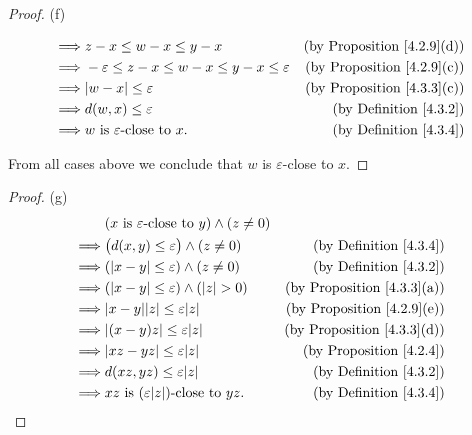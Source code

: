 \begin{proof}{(f)}
\begin{itemize}
\begin{align*}
                  \implies & z - x \leq w - x \leq y - x                                    & \text{(by Proposition \ref{4.2.9}(d))} \\
                  \implies & -\varepsilon \leq z - x \leq w - x \leq y - x \leq \varepsilon & \text{(by Proposition \ref{4.2.9}(c))} \\
                  \implies & \abs*{w - x} \leq \varepsilon                                  & \text{(by Proposition \ref{4.3.3}(c))} \\
                  \implies & d(w, x) \leq \varepsilon                                       & \text{(by Definition \ref{4.3.2})}     \\
                  \implies & w \text{ is } \varepsilon\text{-close to } x.                  & \text{(by Definition \ref{4.3.4})}
              \end{align*}
    \end{itemize}
    From all cases above we conclude that \(w\) is \(\varepsilon\)-close to \(x\).
\end{proof}

\begin{proof}{(g)}
    \begin{align*}
                 & (x \text{ is } \varepsilon\text{-close to } y) \land (z \neq 0)                                          \\
        \implies & \big(d(x, y) \leq \varepsilon\big) \land (z \neq 0)             & \text{(by Definition \ref{4.3.4})}     \\
        \implies & (\abs*{x - y} \leq \varepsilon) \land (z \neq 0)                & \text{(by Definition \ref{4.3.2})}     \\
        \implies & (\abs*{x - y} \leq \varepsilon) \land (\abs*{z} > 0)            & \text{(by Proposition \ref{4.3.3}(a))} \\
        \implies & \abs*{x - y} \abs*{z} \leq \varepsilon \abs*{z}                 & \text{(by Proposition \ref{4.2.9}(e))} \\
        \implies & \abs*{(x - y)z} \leq \varepsilon \abs*{z}                       & \text{(by Proposition \ref{4.3.3}(d))} \\
        \implies & \abs*{xz - yz} \leq \varepsilon \abs*{z}                        & \text{(by Proposition \ref{4.2.4})}    \\
        \implies & d(xz, yz) \leq \varepsilon \abs*{z}                             & \text{(by Definition \ref{4.3.2})}     \\
        \implies & xz \text{ is } (\varepsilon \abs*{z})\text{-close to } yz.      & \text{(by Definition \ref{4.3.4})}
    \end{align*}
\end{proof}


